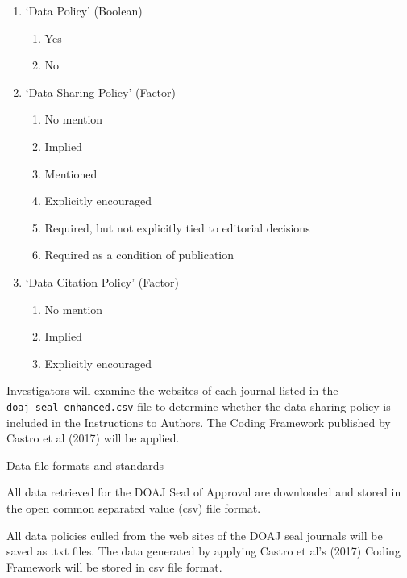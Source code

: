 \documentclass[]{article}
\providecommand{\tightlist}{%
  \setlength{\itemsep}{0pt}\setlength{\parskip}{0pt}}
\begin{document}
\begin{enumerate}
\def\labelenumi{\arabic{enumi}.}
\tightlist
\item
  `Data Policy' (Boolean)

  \begin{enumerate}
  \def\labelenumii{\alph{enumii}.}
  \tightlist
  \item
    Yes
  \item
    No
  \end{enumerate}
\item
  `Data Sharing Policy' (Factor)

  \begin{enumerate}
  \def\labelenumii{\alph{enumii}.}
  \tightlist
  \item
    No mention
  \item
    Implied
  \item
    Mentioned
  \item
    Explicitly encouraged
  \item
    Required, but not explicitly tied to editorial decisions
  \item
    Required as a condition of publication
  \end{enumerate}
\item
  `Data Citation Policy' (Factor)

  \begin{enumerate}
  \def\labelenumii{\alph{enumii}.}
  \tightlist
  \item
    No mention
  \item
    Implied
  \item
    Explicitly encouraged
  \end{enumerate}
\end{enumerate}

Investigators will examine the websites of each journal listed in the
\texttt{doaj\_seal\_enhanced.csv} file to determine whether the data
sharing policy is included in the Instructions to Authors. The Coding
Framework published by Castro et al (2017) will be applied.

Data file formats and standards

All data retrieved for the DOAJ Seal of Approval are downloaded and
stored in the open common separated value (csv) file format.

All data policies culled from the web sites of the DOAJ seal journals
will be saved as .txt files. The data generated by applying Castro et
al's (2017) Coding Framework will be stored in csv file format.
\end{document}
